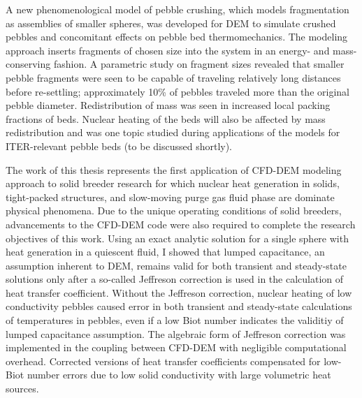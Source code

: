 A new phenomenological model of pebble crushing, which models fragmentation as assemblies of smaller spheres, was developed for DEM to simulate crushed pebbles and concomitant effects on pebble bed thermomechanics. The modeling approach inserts fragments of chosen size into the system in an energy- and mass-conserving fashion. A parametric study on fragment sizes revealed that smaller pebble fragments were seen to be capable of traveling relatively long distances before re-settling; approximately 10\% of pebbles traveled more than the original pebble diameter. Redistribution of mass was seen in increased local packing fractions of beds. Nuclear heating of the beds will also be affected by mass redistribution and was one topic studied during applications of the models for ITER-relevant pebble beds (to be discussed shortly). %

The work of this thesis represents the first application of CFD-DEM modeling approach to solid breeder research for which nuclear heat generation in solids, tight-packed structures, and slow-moving purge gas fluid phase are dominate physical phenomena. Due to the unique operating conditions of solid breeders, advancements to the CFD-DEM code were also required to complete the research objectives of this work. Using an exact analytic solution for a single sphere with heat generation in a quiescent fluid, I showed that lumped capacitance, an assumption inherent to DEM, remains valid for both transient and steady-state solutions only after a so-called Jeffreson correction is used in the calculation of heat transfer coefficient. Without the Jeffreson correction, nuclear heating of low conductivity pebbles caused error in both transient and steady-state calculations of temperatures in pebbles, even if a low Biot number indicates the validitiy of lumped capacitance assumption. The algebraic form of Jeffreson correction was implemented in the coupling between CFD-DEM with negligible computational overhead. Corrected versions of heat transfer coefficients compensated for low-Biot number errors due to low solid conductivity with large volumetric heat sources. 

